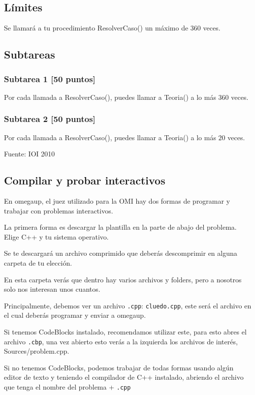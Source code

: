 \subsection*{Límites}
Se llamará a tu procedimiento ResolverCaso() un máximo de \(360\) veces.
\subsection*{Subtareas}
\subsubsection*{Subtarea 1 [50 puntos]}
Por cada llamada a ResolverCaso(), puedes llamar a Teoria() a lo más \(360\) veces.
\subsubsection*{Subtarea 2 [50 puntos]}
Por cada llamada a ResolverCaso(), puedes llamar a Teoria() a lo más \(20\) veces.

Fuente: IOI 2010


\problembreak

\subsection*{Compilar y probar interactivos}
En omegaup, el juez utilizado para la OMI hay dos formas de programar y trabajar con problemas interactivos.

La primera forma es descargar la plantilla en la parte de abajo del problema. Elige C++ y tu sistema operativo.

Se te descargará un archivo comprimido que deberás descomprimir en alguna carpeta de tu elección.

En esta carpeta verás que dentro hay varios archivos y folders, pero a nosotros solo nos interesan unos cuantos. 

Principalmente, debemos ver un archivo \verb|.cpp|: \verb|cluedo.cpp|, este será el archivo en el cual deberás programar y enviar a omegaup. 

Si tenemos CodeBlocks instalado, recomendamos utilizar este, para esto abres el archivo \verb|.cbp|, una vez abierto esto verás a la izquierda 	los archivos de interés, Sources/problem.cpp.

Si no tenemos CodeBlocks, podemos trabajar de todas formas usando algún editor de texto y teniendo el compilador de C++ instalado, abriendo el archivo que tenga el nombre del problema + \verb|.cpp|

